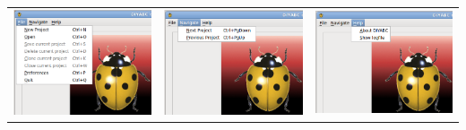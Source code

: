 \begin{center} 
\begin{tabular}{ccc}
\includegraphics[scale=0.3]{gui_pictures/Capture-DIYABC-2.png} & \includegraphics[scale=0.3]{gui_pictures/Capture-DIYABC-3.png}  & \includegraphics[scale=0.3]{gui_pictures/Capture-DIYABC-4.png}\\
\end{tabular}
\end{center}

